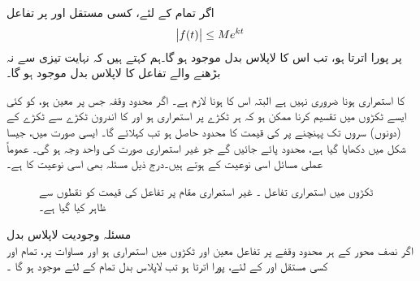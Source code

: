 اگر تمام   کے لئے، کسی مستقل  اور  پر تفاعل  
\begin{align}\label{مساوات_لاپلاس_بڑھنے_کی_حد}
\abs{f(t)} \le M e^{kt}
\end{align}
پر پورا اترتا ہو، تب اس کا لاپلاس بدل موجود ہو گا۔ہم کہتے ہیں کہ نہایت تیزی سے نہ بڑھنے والے  تفاعل  کا لاپلاس بدل موجود ہو گا۔

 کا استمراری  ہونا ضروری نہیں ہے البتہ اس کا  ہونا لازم ہے۔  اگر محدود وقفہ  جس پر  معین ہو، کو کئی ایسے ٹکڑوں میں تقسیم کرنا ممکن ہو کہ ہر ٹکڑے پر  استمراری ہو اور  کا اندرون ٹکڑے سے ٹکڑے کے (دونوں) سروں تک پہنچنے پر   کی قیمت کا  محدود حاصل ہو تب   کہلائے گا۔ ایسی صورت میں، جیسا شکل  میں دکھایا گیا ہے، محدود  پائے جائیں گے جو غیر استمراری صورت کی واحد وجہ ہو گی۔ عموماً عملی مسائل اسی نوعیت کے ہوتے ہیں۔درج ذیل مسئلہ بھی اسی نوعیت کا ہے۔ 
\begin{figure}
\centering
{}
\caption{ٹکڑوں میں استمراری تفاعل ۔ غیر استمراری مقام پر تفاعل کی قیمت کو نقطوں سے ظاہر کیا گیا ہے۔}
\label{شکل_لاپلاس_ٹکڑوں_استمراری}
\end{figure}

\quad مسئلہ وجودیت لاپلاس بدل\\
اگر نصف محور  کے ہر محدود وقفے پر تفاعل  معین اور ٹکڑوں میں استمراری ہو اور مساوات  پر، 
تمام  اور کسی مستقل  اور  کے لئے،  پورا اترتا ہو تب لاپلاس بدل  تمام  کے لئے موجود ہو گا ۔ 

